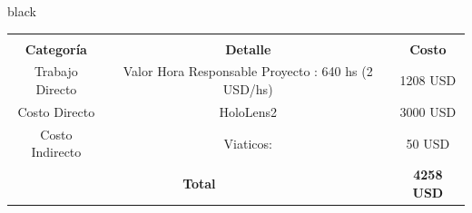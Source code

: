 \documentclass[11pt]{charter}
\begin{document}
\begin{consigna}{black}
\begin{table}[H]
\setlength\arrayrulewidth{1pt}
\begin{tabular}{|c|c|c|l|}
\hline
\cellcolor[HTML]{CBCEFB}                            & \cellcolor[HTML]{CBCEFB}                           & \multicolumn{2}{c|}{\cellcolor[HTML]{CBCEFB}}                        \\
\multirow{-2}{*}{\cellcolor[HTML]{CBCEFB}\textbf {Categoría}} & \multirow{-2}{*}{\cellcolor[HTML]{CBCEFB} \textbf {Detalle}}  & \multicolumn{2}{c|}{\multirow{-2}{*}{\cellcolor[HTML]{CBCEFB} \textbf {Costo}}} \\ \hline
Trabajo Directo                                     & Valor Hora Responsable Proyecto : 640 hs (2 USD/hs) & \multicolumn{2}{c|}{1208 USD}                                         \\ \hline
Costo Directo                                       & HoloLens2                                          & \multicolumn{2}{c|}{3000 USD}                                        \\ \hline
Costo Indirecto                                     & Viaticos:                              & \multicolumn{2}{c|}{50 USD}                                             \\ \hline
\multicolumn{2}{|c|}{\textbf {Total}}                                                                              & \multicolumn{2}{c|}{\textbf {4258 USD}}                                             \\ \hline
\end{tabular}
\end{table}

\end{consigna}
\end{document}
